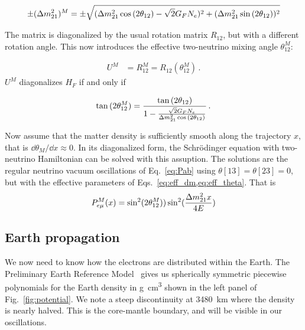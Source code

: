 \begin{align}\label{eq:eff_dm}
    \pm (\dm[21])^M = \pm \sqrt{(\dm[21] \cos{(2\theta_{12}) - \sqrt{2}G_F N_e})^2 + (\dm[21]\sin{(2\theta_{12})})^2}
\end{align}

The matrix is diagonalized by the usual rotation matrix $R_{12}$, but with a different rotation angle. This now introduces the effective two-neutrino mixing angle $\theta_{12}^M$:

\begin{align}
    U^M &= R_{12}^M = R_{12}(\theta_{12}^M)\,.
\end{align}
$U^M$ diagonalizes $H_F$ if and only if 

\begin{align}\label{eq:eff_theta}
    \tan{(2\theta_{12}^M)} = \frac{\tan{(2\theta_{12})}}{1- \frac{\sqrt{2}G_F N_e}{\dm[21]\cos{(2\theta_{12})}}}\,.
\end{align}

Now assume that the matter density is sufficiently smooth along the trajectory $x$, that is $\dd \theta_M / \dd x \approx 0$.
In its diagonalized form, the Schrödinger equation with two-neutrino Hamiltonian can be solved with this assuption. The solutions are the regular neutrino vacuum oscillations of Eq.~\eqref{eq:Pab} using $\theta[13] = \theta[23] =0$, but with the effective parameters of Eqs.~\eqref{eq:eff_dm,eq:eff_theta}. That is
\begin{align}
    P_{e\mu}^M(x) = \sin^2(2\theta_{12}^M))\sin^2(\frac{\dm[21]x}{4E})
\end{align}

\subsection{Earth propagation}

We now need to know how the electrons are distributed within the Earth. The Preliminary Earth Reference Model~\cite{PREM} gives us spherically
symmetric piecewise polynomials for the Earth density in \si{\gram \cm^3} shown in the left panel of Fig.~\ref{fig:potential}.
We note a steep discontinuity at \SI{3480}{\km} where the density is nearly halved. This is the core-mantle boundary, and will be visible in our 
oscillations.

